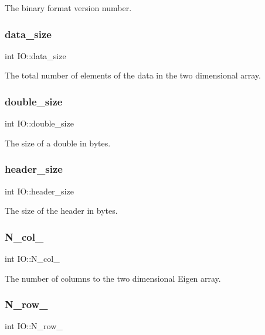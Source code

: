 The binary format version number. \mbox{\label{class_i_o_a39a8a0474a288522d847f6be0fb2403f}} 
\subsubsection{\texorpdfstring{data\+\_\+size}{data\_size}}
{\footnotesize\ttfamily int I\+O\+::data\+\_\+size}

The total number of elements of the data in the two dimensional array. \mbox{\label{class_i_o_a3af3bf77eacd18c1c50cbf78b46c4228}} 
\subsubsection{\texorpdfstring{double\+\_\+size}{double\_size}}
{\footnotesize\ttfamily int I\+O\+::double\+\_\+size}

The size of a double in bytes. \mbox{\label{class_i_o_aee540c40b18d5f9990bf8d7e12cb0827}} 
\subsubsection{\texorpdfstring{header\+\_\+size}{header\_size}}
{\footnotesize\ttfamily int I\+O\+::header\+\_\+size}

The size of the header in bytes. \mbox{\label{class_i_o_a64aae2d2be35348233f8ddac4d6791f2}} 
\subsubsection{\texorpdfstring{N\+\_\+col\+\_\+}{N\_col\_}}
{\footnotesize\ttfamily int I\+O\+::\+N\+\_\+col\+\_\+}

The number of columns to the two dimensional Eigen array. \mbox{\label{class_i_o_ab8aa1490df2e2e758766030afdae3a40}} 
\subsubsection{\texorpdfstring{N\+\_\+row\+\_\+}{N\_row\_}}
{\footnotesize\ttfamily int I\+O\+::\+N\+\_\+row\+\_\+}

